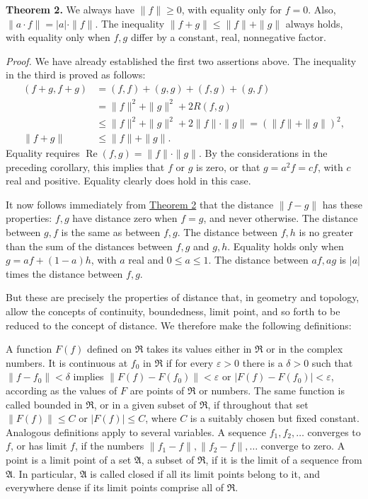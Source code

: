 \documentclass[fontsize=13pt,twoside,openany,headings=normal,parskip=false,bookmarkpackage=false,DIV=calc]{scrbook}
\begin{document}
\leavevmode{}\textbf{Theorem 2.}\label{thm:II.2} We always have $\|f\|\geq0$, with equality only for $f=0$. Also, $\|a\cdot f\|=|a|\cdot\|f\|$. The inequality $\|f+g\|\leq\|f\|+\|g\|$ always holds, with equality only when $f,g$ differ by a constant, real, nonnegative factor.

\emph{Proof.} We have already established the first two assertions above. The inequality in the third is proved as follows:
\begin{align*}
(f+g,f+g)&=(f,f)+(g,g)+(f,g)+(g,f)\\
&=\|f\|^2+\|g\|^2+2R(f,g)\\
&\leq\|f\|^2+\|g\|^2+2\|f\|\cdot\|g\|
=(\|f\|+\|g\|)^2,\\
\|f+g\|&\leq\|f\|+\|g\|.
\end{align*}
Equality requires $\operatorname{Re}(f,g)=\|f\|\cdot\|g\|$. By the considerations in the preceding corollary, this implies that $f$ or $g$ is zero, or that $g=a^2f=cf$, with $c$ real and positive. Equality clearly does hold in this case.

It now follows immediately from \hyperref[thm:II.2]{Theorem 2} that the distance $\|f-g\|$ has these properties: $f,g$ have distance zero when $f=g$, and never otherwise. The distance between $g,f$ is the same as between $f,g$. The distance between $f,h$ is no greater than the sum of the distances between $f,g$ and $g,h$. Equality holds only when $g=af+(1-a)h$, with $a$ real and $0\leq a\leq1$. The distance between $af,ag$ is $|a|$ times the distance between $f,g$.

\hypertarget{origpage-23}{}%
But these are precisely the properties of distance that, in geometry and topology, allow the concepts of continuity, boundedness, limit point, and so forth to be reduced to the concept of distance. We therefore make the following definitions:

A function $F(f)$ defined on $\mathfrak{R}$ takes its values either in $\mathfrak{R}$ or in the complex numbers. It is continuous at $f_0$ in $\mathfrak{R}$ if for every $\varepsilon>0$ there is a $\delta>0$ such that $\|f-f_0\|<\delta$ implies $\|F(f)-F(f_0)\|<\varepsilon$ or $|F(f)-F(f_0)|<\varepsilon$, according as the values of $F$ are points of $\mathfrak{R}$ or numbers. The same function is called bounded in $\mathfrak{R}$, or in a given subset of $\mathfrak{R}$, if throughout that set $\|F(f)\|\leq C$ or $|F(f)|\leq C$, where $C$ is a suitably chosen but fixed constant. Analogous definitions apply to several variables. A sequence $f_1,f_2,\ldots$ converges to $f$, or has limit $f$, if the numbers $\|f_1-f\|,\|f_2-f\|,\ldots$ converge to zero. A point is a limit point of a set $\mathfrak{A}$, a subset of $\mathfrak{R}$, if it is the limit of a sequence from $\mathfrak{A}$. In particular, $\mathfrak{A}$ is called closed if all its limit points belong to it, and everywhere dense if its limit points comprise all of $\mathfrak{R}$.
\end{document}
